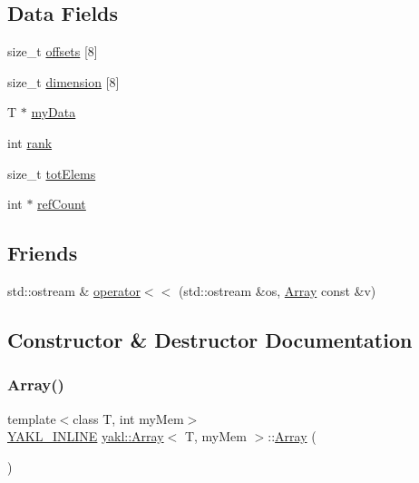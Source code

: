 \subsection*{Data Fields}
\begin{DoxyCompactItemize}
\item 
size\+\_\+t \hyperlink{classyakl_1_1Array_a761f9e20b65f283252bdb4dccaa3aa82}{offsets} \mbox{[}8\mbox{]}
\item 
size\+\_\+t \hyperlink{classyakl_1_1Array_a0ccbe72c84f403916ede27ca59fadff5}{dimension} \mbox{[}8\mbox{]}
\item 
T $\ast$ \hyperlink{classyakl_1_1Array_affc83b170224c420db2a3de1ed8752f7}{my\+Data}
\item 
int \hyperlink{classyakl_1_1Array_a3c50a377d5370bbff2ad29db3c5f544d}{rank}
\item 
size\+\_\+t \hyperlink{classyakl_1_1Array_a82f958312103b5daa01bab785ed9a47e}{tot\+Elems}
\item 
int $\ast$ \hyperlink{classyakl_1_1Array_a4fce1cc9b063282722194c220b8a36b5}{ref\+Count}
\end{DoxyCompactItemize}
\subsection*{Friends}
\begin{DoxyCompactItemize}
\item 
std\+::ostream \& \hyperlink{classyakl_1_1Array_af3c30c6a8edc4832f6196fd3f2b4e2e5}{operator$<$$<$} (std\+::ostream \&os, \hyperlink{classyakl_1_1Array}{Array} const \&v)
\end{DoxyCompactItemize}


\subsection{Constructor \& Destructor Documentation}
\mbox{\label{classyakl_1_1Array_a2a77e629aa837ef799f026fb6640698d}} 
\subsubsection{\texorpdfstring{Array()}{Array()}\hspace{0.1cm}{\footnotesize\ttfamily [1/12]}}
{\footnotesize\ttfamily template$<$class T, int my\+Mem$>$ \\
\hyperlink{YAKL_8h_aa0dd629ffce6d564b19e9313fb91a5ad}{Y\+A\+K\+L\+\_\+\+I\+N\+L\+I\+NE} \hyperlink{classyakl_1_1Array}{yakl\+::\+Array}$<$ T, my\+Mem $>$\+::\hyperlink{classyakl_1_1Array}{Array} (\begin{DoxyParamCaption}{ }\end{DoxyParamCaption})\hspace{0.3cm}{\ttfamily [inline]}}

